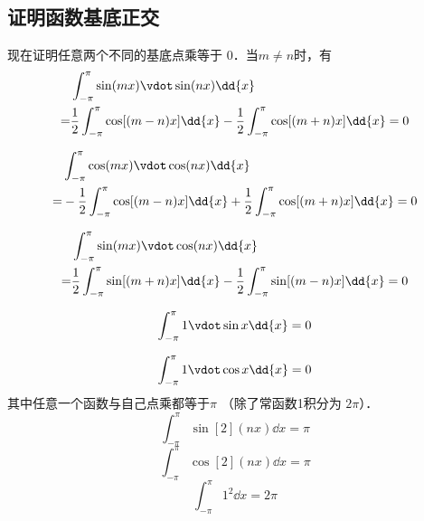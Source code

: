 \subsection{证明函数基底正交}

现在证明任意两个不同的基底点乘等于 0．当$m \ne n$时，有
\begin{equation}\begin{aligned}
&\int_{ - \pi }^\pi  \sin(mx) \vdot \sin(nx) \dd{x} \\
 = &\frac{1}{2}\int_{ - \pi }^\pi  \cos [ {(m - n)x} ] \dd{x}  - \frac{1}{2}\int_{ - \pi }^\pi  \cos [ {(m + n)x} ] \dd{x}  = 0
\end{aligned}\end{equation}

\begin{equation}\begin{aligned}
&\int_{ - \pi }^\pi  \cos(mx) \vdot \cos(nx) \dd{x} \\
 =  &- \frac{1}{2}\int_{ - \pi }^\pi  \cos [ {(m - n)x} ] \dd{x}  + \frac{1}{2}\int_{ - \pi }^\pi  \cos [ {(m + n)x} ] \dd{x}  = 0
\end{aligned}\end{equation}

\begin{equation}\begin{aligned}
&\int_{ - \pi }^\pi  \sin(mx) \vdot \cos(nx) \dd{x}\\
= &\frac{1}{2}\int_{ - \pi }^\pi  \sin [ {(m + n)x} ] \dd{x}  - \frac{1}{2}\int_{ - \pi }^\pi  \sin [ {(m - n)x} ] \dd{x} = 0
\end{aligned}\end{equation}

\begin{equation}
\int_{ - \pi }^\pi  1 \vdot \sin x \dd{x}  = 0
\end{equation}

\begin{equation}
\int_{ - \pi }^\pi  1 \vdot \cos x \dd{x}  = 0\\
\end{equation}
其中任意一个函数与自己点乘都等于$\pi $ （除了常函数1积分为 $2\pi$）．
\begin{equation}
\int_{ - \pi }^\pi \sin[2](nx) \dd{x} = \pi
\end{equation}
\begin{equation}
\int_{ - \pi }^\pi \cos[2](nx) \dd{x} = \pi
\end{equation}
\begin{equation}
\int_{ - \pi }^\pi 1^2 \dd{x} = 2\pi
\end{equation}

